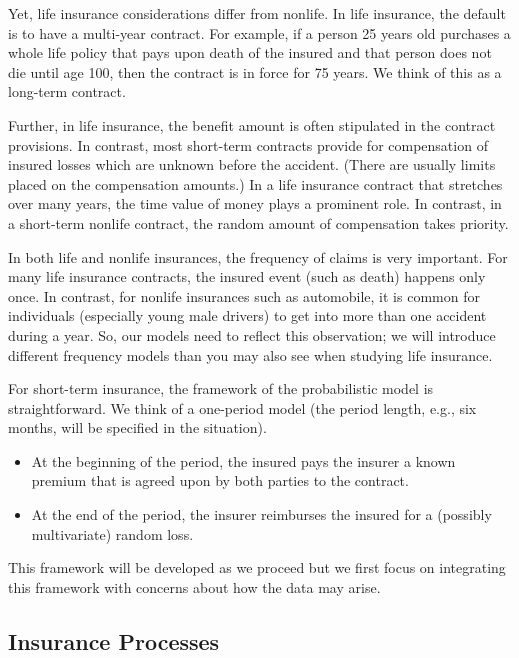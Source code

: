 \documentclass[]{book}
\theoremstyle{definition}
\theoremstyle{definition}
\theoremstyle{definition}
\theoremstyle{remark}
\begin{document}
Yet, life insurance considerations differ from nonlife. In life
insurance, the default is to have a multi-year contract. For example, if
a person 25 years old purchases a whole life policy that pays upon death
of the insured and that person does not die until age 100, then the
contract is in force for 75 years. We think of this as a long-term
contract.

Further, in life insurance, the benefit amount is often stipulated in
the contract provisions. In contrast, most short-term contracts provide
for compensation of insured losses which are unknown before the
accident. (There are usually limits placed on the compensation amounts.)
In a life insurance contract that stretches over many years, the time
value of money plays a prominent role. In contrast, in a short-term
nonlife contract, the random amount of compensation takes priority.

In both life and nonlife insurances, the frequency of claims is very
important. For many life insurance contracts, the insured event (such as
death) happens only once. In contrast, for nonlife insurances such as
automobile, it is common for individuals (especially young male drivers)
to get into more than one accident during a year. So, our models need to
reflect this observation; we will introduce different frequency models
than you may also see when studying life insurance.

For short-term insurance, the framework of the probabilistic model is
straightforward. We think of a one-period model (the period length,
e.g., six months, will be specified in the situation).

\begin{itemize}
\item
  At the beginning of the period, the insured pays the insurer a known
  premium that is agreed upon by both parties to the contract.
\item
  At the end of the period, the insurer reimburses the insured for a
  (possibly multivariate) random loss.
\end{itemize}

This framework will be developed as we proceed but we first focus on
integrating this framework with concerns about how the data may arise.

\subsection{Insurance Processes}\label{S:InsProcesses}
\end{document}
